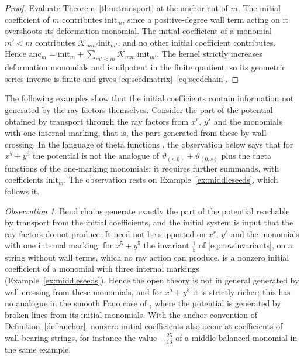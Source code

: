 \documentclass[11pt]{amsart}
\theoremstyle{definition}
\theoremstyle{remark}
\newtheorem{observation}[theorem]{Observation}
\begin{document}
\begin{proof}
Evaluate Theorem~\ref{thm:transport} at the anchor cut of $m$.  The initial
coefficient of $m$ contributes $\mathrm{init}_m$, since a positive-degree wall
term acting on it overshoots its deformation monomial.  The initial coefficient
of a monomial $m'<m$ contributes $\mathcal K_{mm'}\mathrm{init}_{m'}$, and no
other initial coefficient contributes.  Hence
$\mathrm{anc}_m=\mathrm{init}_m+\sum_{m'<m}\mathcal K_{mm'}\mathrm{init}_{m'}$.
The kernel strictly increases
deformation monomials and is nilpotent in the finite quotient, so its geometric
series inverse is finite and gives
\eqref{eq:seedmatrix}--\eqref{eq:seedchain}.  \qedhere
\end{proof}

The following examples show that the initial coefficients contain
information not generated by the ray factors themselves.  Consider the part of
the potential obtained by transport through the ray factors from $x^r$, $y^s$
and the monomials with one internal marking, that is, the part generated from
these by wall-crossing.  In the language of theta functions
\cite{GHK15,GHKK}, the observation below says that for $x^5+y^5$ the
potential is not the analogue of $\vartheta_{(r,0)}+\vartheta_{(0,s)}$ plus
the theta functions of the one-marking monomials: it requires further
summands, with coefficients $\mathrm{init}_m$.  The observation rests on
Example~\ref{ex:middleseeds}, which follows it.
\begin{observation}
\label{obs:richer}
Bend chains generate exactly the part of the potential reachable by transport
from the initial coefficients, and the initial system is input that the ray
factors do not produce.  It need not be supported on $x^r$, $y^s$ and the
monomials with one internal marking: for $x^5+y^5$ the invariant $\tfrac15$ of
\eqref{eq:newinvariants}, on a string without wall terms, which no ray action
can produce, is a nonzero initial coefficient of a monomial with three internal
markings (Example~\ref{ex:middleseeds}).  Hence the open theory is not in general generated
by wall-crossing from these monomials, and for $x^5+y^5$ it is strictly richer;
this has no analogue in the smooth Fano case of \cite{Gross10,CPS}, where the
potential is generated by broken lines from its initial monomials.  With the
anchor convention of
Definition~\ref{def:anchor}, nonzero initial coefficients also occur at
coefficients of wall-bearing strings, for instance the value $-\tfrac{25}{16}$ of a middle
balanced monomial in the same example.
\end{observation}
\end{document}
